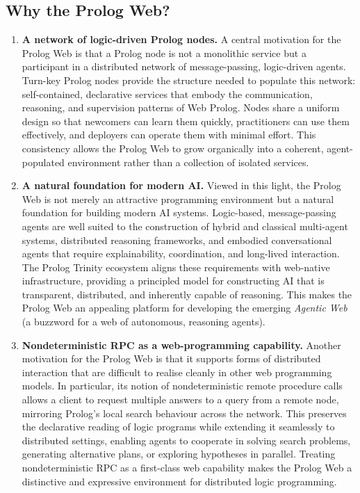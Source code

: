 \subsection{Why the Prolog Web?}\label{sec:why-prolog-web}

\begin{enumerate}

\item \textbf{A network of logic-driven Prolog nodes.}
A central motivation for the Prolog Web is that a Prolog node is not a monolithic service but a participant in a distributed network of message-passing, logic-driven agents. Turn-key Prolog nodes provide the structure needed to populate this network: self-contained, declarative services that embody the communication, reasoning, and supervision patterns of Web Prolog. Nodes share a uniform design so that newcomers can learn them quickly, practitioners can use them effectively, and deployers can operate them with minimal effort. This consistency allows the Prolog Web to grow organically into a coherent, agent-populated environment rather than a collection of isolated services.

\item \textbf{A natural foundation for modern AI.}
Viewed in this light, the Prolog Web is not merely an attractive programming environment but a natural foundation for building modern AI systems. Logic-based, message-passing agents are well suited to the construction of hybrid and classical multi-agent systems, distributed reasoning frameworks, and embodied conversational agents that require explainability, coordination, and long-lived interaction. The Prolog Trinity ecosystem aligns these requirements with web-native infrastructure, providing a principled model for constructing AI that is transparent, distributed, and inherently capable of reasoning. This makes the Prolog Web an appealing platform for developing the emerging \emph{Agentic Web} (a buzzword for a web of autonomous, reasoning agents).

\item \textbf{Nondeterministic RPC as a web-programming capability.}
Another motivation for the Prolog Web is that it supports forms of distributed interaction that are difficult to realise cleanly in other web programming models. In particular, its notion of nondeterministic remote procedure calls allows a client to request multiple answers to a query from a remote node, mirroring Prolog's local search behaviour across the network. This preserves the declarative reading of logic programs while extending it seamlessly to distributed settings, enabling agents to cooperate in solving search problems, generating alternative plans, or exploring hypotheses in parallel. Treating nondeterministic RPC as a first-class web capability makes the Prolog Web a distinctive and expressive environment for distributed logic programming.


\end{enumerate}

